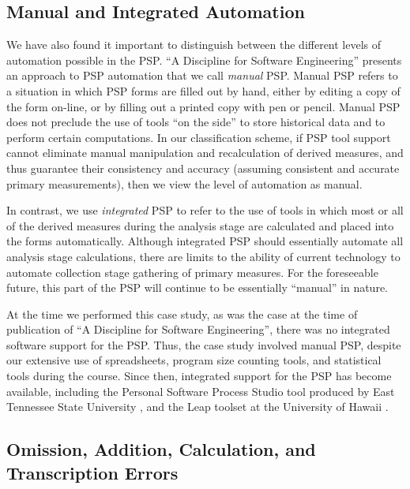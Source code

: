 \subsection{Manual and Integrated Automation}

We have also found it important to distinguish between the different levels of
automation possible in the PSP.  ``A Discipline for Software Engineering''
\cite{Humphrey95} presents an approach to PSP automation that we call {\em
  manual} PSP.  Manual PSP refers to a situation in which PSP forms are
filled out by hand, either by editing a copy of the form on-line, or by
filling out a printed copy with pen or pencil.  Manual PSP does not
preclude the use of tools ``on the side'' to store historical data and to
perform certain computations.  In our classification scheme, if PSP tool
support cannot eliminate manual manipulation and recalculation of derived
measures, and thus guarantee their consistency and accuracy 
(assuming consistent and accurate primary measurements), then we view the level
of automation as manual.

In contrast, we use {\em integrated} PSP to refer to the use of tools in which most
or all of the derived measures during the analysis stage are calculated and
placed into the forms automatically.  Although integrated PSP should
essentially automate all analysis stage calculations, there are
limits to the ability of current technology to automate collection stage
gathering of primary measures. For the foreseeable future, this part of the
PSP will continue to be essentially ``manual'' in nature.

At the time we performed this case study, as was the case at the time of
publication of ``A Discipline for Software Engineering'', there was no
integrated software support for the PSP.  Thus, the case study involved
manual PSP, despite our extensive use of spreadsheets, program size
counting tools, and statistical tools during the course.  Since then, 
integrated support for the PSP has become available, including
the Personal Software Process Studio tool
produced by East Tennessee State University \cite{Henry97}, and 
the Leap toolset at the University of Hawaii \cite{Moore98}.

\subsection{Omission, Addition, Calculation, and Transcription Errors}

